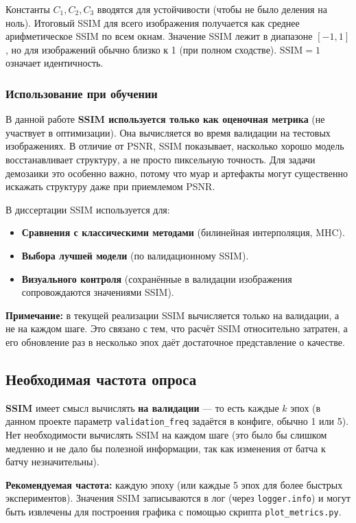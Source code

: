 \documentclass[12pt,a4paper]{article}
\begin{document}
Константы \(C_1, C_2, C_3\) вводятся для устойчивости (чтобы не было деления на ноль). Итоговый SSIM для всего изображения получается как среднее арифметическое SSIM по всем окнам. Значение SSIM лежит в диапазоне \([-1, 1]\), но для изображений обычно близко к 1 (при полном сходстве). \(\text{SSIM} = 1\) означает идентичность.

\subsubsection{Использование при обучении}

В данной работе \textbf{SSIM используется только как оценочная метрика} (не участвует в оптимизации). Она вычисляется во время валидации на тестовых изображениях. В отличие от PSNR, SSIM показывает, насколько хорошо модель восстанавливает структуру, а не просто пиксельную точность. Для задачи демозаики это особенно важно, потому что муар и артефакты могут существенно искажать структуру даже при приемлемом PSNR.

В диссертации SSIM используется для:
\begin{itemize}
    \item \textbf{Сравнения с классическими методами} (билинейная интерполяция, MHC).
    \item \textbf{Выбора лучшей модели} (по валидационному SSIM).
    \item \textbf{Визуального контроля} (сохранённые в валидации изображения сопровождаются значениями SSIM).
\end{itemize}

\textbf{Примечание:} в текущей реализации SSIM вычисляется только на валидации, а не на каждом шаге. Это связано с тем, что расчёт SSIM относительно затратен, а его обновление раз в несколько эпох даёт достаточное представление о качестве.

\subsection{Необходимая частота опроса}

\textbf{SSIM} имеет смысл вычислять \textbf{на валидации} — то есть каждые \(k\) эпох (в данном проекте параметр \texttt{validation\_freq} задаётся в конфиге, обычно 1 или 5). Нет необходимости вычислять SSIM на каждом шаге (это было бы слишком медленно и не дало бы полезной информации, так как изменения от батча к батчу незначительны).

\textbf{Рекомендуемая частота:} каждую эпоху (или каждые 5 эпох для более быстрых экспериментов). Значения SSIM записываются в лог (через \texttt{logger.info}) и могут быть извлечены для построения графика с помощью скрипта \texttt{plot\_metrics.py}.
\end{document}
